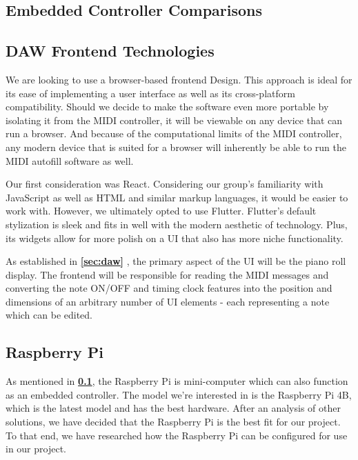 \blindtext

\subsection{Embedded Controller Comparisons}
\label{sec:embedded_controllers}

\blindtext

\subsection{DAW Frontend Technologies}

We are looking to use a browser-based frontend Design. This approach is ideal for its ease
of implementing a user interface as well as its cross-platform compatibility. Should we
decide to make the software even more portable by isolating it from the MIDI controller,
it will be viewable on any device that can run a browser. And because of the computational
limits of the MIDI controller, any modern device that is suited for a browser will
inherently be able to run the MIDI autofill software as well.

Our first consideration was React. Considering our group's familiarity with JavaScript as
well as HTML and similar markup languages, it would be easier to work with. However, we
ultimately opted to use Flutter. Flutter's default stylization is sleek and fits in well
with the modern aesthetic of technology. Plus, its widgets allow for more polish on a UI
that also has more niche functionality.

As established in \textbf{\ref{sec:daw} }, the primary aspect of the UI
will be the piano roll display. The frontend will be responsible for reading the MIDI
messages and converting the note ON/OFF and timing clock features into the position and
dimensions of an arbitrary number of UI elements - each representing a note which can be
edited.

\subsection{Raspberry Pi}

As mentioned in \textbf{\ref{sec:embedded_controllers}},
the Raspberry Pi is mini-computer which can also function as an embedded controller. The
model we're interested in is the Raspberry Pi 4B, which is the latest model and has the
best hardware. After an analysis of other solutions, we have decided that the
Raspberry Pi is the best fit for our project. To that end, we have researched how the
Raspberry Pi can be configured for use in our project.

